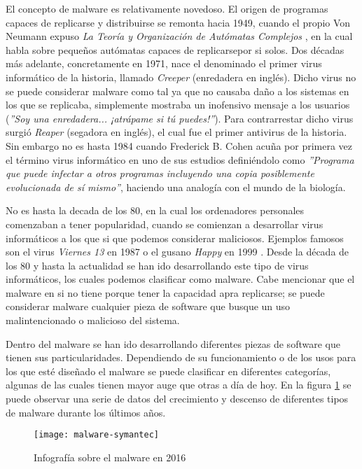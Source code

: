 El concepto de malware es relativamente novedoso. El origen de programas capaces de replicarse y distribuirse se remonta hacia 1949, cuando el propio Von Neumann expuso \emph{La Teoría y Organización de Autómatas Complejos} \cite{von-neumann}, en la cual habla sobre pequeños autómatas capaces de replicarsepor si solos. Dos décadas más adelante, concretamente en 1971, nace el denominado el primer virus informático de la historia, llamado \emph{Creeper} \cite{creeper} (enredadera en inglés).  Dicho virus no se puede considerar malware como tal ya que no causaba daño a los sistemas en los que se replicaba, simplemente mostraba un inofensivo mensaje a los usuarios (\textsl{''Soy una enredadera... ¡atrápame si tú puedes!''}). Para contrarrestar dicho virus surgió \emph{Reaper} (segadora en inglés), el cual fue el primer antivirus de la historia. Sin embargo no es hasta 1984 cuando Frederick B. Cohen acuña por primera vez el término virus informático en uno de sus estudios definiéndolo como \emph{''Programa que puede infectar a otros programas incluyendo una copia posiblemente evolucionada de sí mismo''}, haciendo una analogía con el mundo de la biología.

No es hasta la decada de los 80, en la cual los ordenadores personales comenzaban a tener popularidad, cuando se comienzan a desarrollar virus informáticos a los que si que podemos considerar maliciosos. Ejemplos famosos son el virus \emph{Viernes 13} en 1987 o el gusano \emph{Happy} en 1999 \cite{panda-virus-history}. Desde la década de los 80 y hasta la actualidad se han ido desarrollando este tipo de virus informáticos, los cuales podemos clasificar como malware. Cabe mencionar que el malware en si no tiene porque tener la capacidad apra replicarse; se puede considerar malware cualquier pieza de software que busque un uso malintencionado o malicioso del sistema.

Dentro del malware se han ido desarrollando diferentes piezas de software que tienen sus particularidades. Dependiendo de su funcionamiento o de los usos para los que esté diseñado el malware se puede clasificar en diferentes categorías, algunas de las cuales tienen mayor auge que otras a día de hoy. En la figura \ref{fig:malware-symantec} se puede observar una serie de datos del crecimiento y descenso de diferentes tipos de malware durante los últimos años.

\begin{figure}[H]
	\centering
	\texttt{[image: malware-symantec]}
	\caption{Infografía sobre el malware en 2016 \cite{malware-symantec}}
	\label{fig:malware-symantec}
\end{figure}

